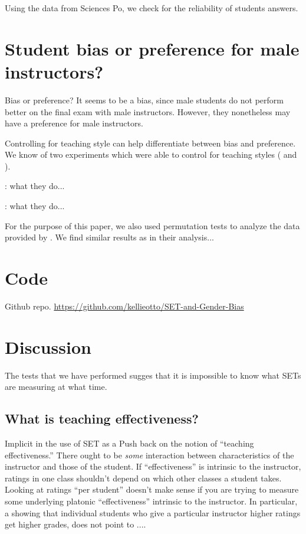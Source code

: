 \documentclass[12pt]{article}
\newcommand{\todo}[1]{{\color{red}{TO DO: \sc #1}}}
\begin{document}
Using the data from Sciences Po, we check for the reliability of students answers. 



\section{Student bias or preference for male instructors?}

Bias or preference? It seems to be a bias, since male students do not perform better on the final exam with male instructors. However, they nonetheless may have a preference for male instructors. 

Controlling for teaching style can help differentiate between bias and preference. We know of two experiments which were able to control for teaching styles (\citet{Arbuckle2003} and \citet{MacNell2014}).  

\citet{Arbuckle2003}: what they do...  


\citet{MacNell2014}: what they do...  


For the purpose of this paper, we also used permutation tests to analyze the data provided by \citet{MacNell2014}. We find similar results as in their analysis...


\section{Code}
Github repo. \url{https://github.com/kellieotto/SET-and-Gender-Bias}

\section{Discussion}

The tests that we have performed sugges that it is impossible to know what SETs are measuring at what time. 




\subsection{What is teaching effectiveness?}

Implicit in the use of SET as a 
Push back on the notion of ``teaching effectiveness.''
There ought to be \emph{some} interaction between characteristics of the
instructor and those of the student.
If ``effectiveness'' is intrinsic to the instructor, ratings in one class shouldn't depend on
which other classes a student takes.
Looking at ratings ``per student'' doesn't make sense if you are trying to
measure some underlying platonic ``effectiveness'' intrinsic to the instructor.
In particular,  a showing that individual students who give a particular instructor higher ratings
get higher grades, does not point to ....\todo{fix me}
\end{document}

